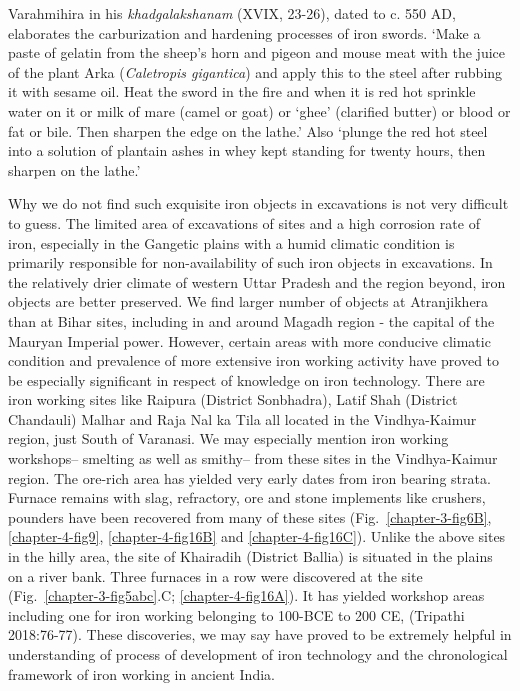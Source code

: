 Varahmihira in his {\it khadgalakshanam} (XVIX, 23-26), dated to c. 550 AD, elaborates the carburization and hardening processes of iron swords. ‘Make a paste of gelatin from the sheep’s horn and pigeon and mouse meat with the juice of the plant Arka ({\it Caletropis gigantica}) and apply this to the steel after rubbing it with sesame oil. Heat the sword in the fire and when it is red hot sprinkle water on it or milk of mare (camel or goat) or ‘ghee’ (clarified butter) or blood or fat or bile. Then sharpen the edge on the lathe.’ Also ‘plunge the red hot steel into a solution of plantain ashes in whey kept standing for twenty hours, then sharpen on the lathe.’ 


Why we do not find such exquisite iron objects in excavations is not very difficult to guess. The limited area of excavations of sites and a high corrosion rate of iron, especially in the Gangetic plains with a humid climatic condition is primarily responsible for non-availability of such iron objects in excavations. In the relatively drier climate of western Uttar Pradesh and the region beyond, iron objects are better preserved. We find larger number of objects at Atranjikhera than at Bihar sites, including in and around Magadh region - the capital of the Mauryan Imperial power. However, certain areas with more conducive climatic condition and prevalence of more extensive iron working activity have proved to be especially significant in respect of knowledge on iron technology.  There are iron working sites like Raipura (District Sonbhadra), Latif Shah (District Chandauli) Malhar and Raja Nal ka Tila all located in the Vindhya-Kaimur region, just South of Varanasi. We may especially mention iron working workshops– smelting as well as smithy– from these sites in the Vindhya-Kaimur region. The ore-rich area has yielded very early dates from iron bearing strata. Furnace remains with slag, refractory, ore and stone implements like crushers, pounders have been recovered from many of these sites (Fig.~\ref{chapter-3-fig6B}, \ref{chapter-4-fig9}, \ref{chapter-4-fig16B} and \ref{chapter-4-fig16C}). Unlike the above sites in the hilly area, the site of Khairadih (District Ballia) is situated in the plains on a river bank. Three furnaces in a row were discovered at the site (Fig.~\ref{chapter-3-fig5abc}.C; \ref{chapter-4-fig16A}). It has yielded workshop areas including one for iron working belonging to 100-BCE to 200 CE, (Tripathi 2018:76-77). These discoveries, we may say have proved to be extremely helpful in understanding of process of development of iron technology  and the chronological framework of iron working in ancient India.

